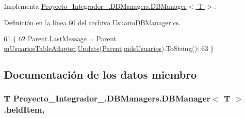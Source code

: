 Implementa \hyperlink{class_proyecto___integrador__3_1_1_d_b_managers_1_1_d_b_manager_3_01_t_01_4_aecafeb72fd4ce55d76c16c804e38dae8}{Proyecto\-\_\-\-Integrador\-\_.\-D\-B\-Managers.\-D\-B\-Manager$<$ T $>$}.



Definición en la línea 60 del archivo Usuario\-D\-B\-Manager.\-cs.


\begin{DoxyCode}
61             \{
62                 \hyperlink{class_proyecto___integrador__3_1_1_d_b_managers_1_1_d_b_manager_3_01_t_01_4_a06315e75298c8f2fd46f32dc7c9a80b2}{Parent}.\hyperlink{class_proyecto___integrador__3_1_1_d_b_managers_aecf2d3981e87f16c1e3a60c7913931a8}{LastMessage} = \hyperlink{class_proyecto___integrador__3_1_1_d_b_managers_1_1_d_b_manager_3_01_t_01_4_a06315e75298c8f2fd46f32dc7c9a80b2}{Parent}.
      \hyperlink{class_proyecto___integrador__3_1_1_d_b_managers_a8830e1bb507bcd7277966a4aabe3e830}{mUsuariosTableAdapter}.\hyperlink{class_proyecto___integrador__3_1_1ds_usuarios_table_adapters_1_1_usuarios_table_adapter_a0cb310a6346b919a7ac5717ea3225d0b}{Update}(\hyperlink{class_proyecto___integrador__3_1_1_d_b_managers_1_1_d_b_manager_3_01_t_01_4_a06315e75298c8f2fd46f32dc7c9a80b2}{Parent}.\hyperlink{class_proyecto___integrador__3_1_1_d_b_managers_a19d87c9abf32e08e2969847a008eb195}{mdsUsuarios}).ToString();
63             \}
\end{DoxyCode}


\subsection{Documentación de los datos miembro}
\hypertarget{class_proyecto___integrador__3_1_1_d_b_managers_1_1_d_b_manager_3_01_t_01_4_a3b67ae3b5b3b9c3793d56c1407d7dcff}{
\subsubsection[{held\-Item}]{\setlength{\rightskip}{0pt plus 5cm}T Proyecto\-\_\-\-Integrador\-\_.\-D\-B\-Managers.\-D\-B\-Manager$<$ T $>$.held\-Item\hspace{0.3cm}{\ttfamily [protected]}, {\ttfamily [inherited]}}}\label{class_proyecto___integrador__3_1_1_d_b_managers_1_1_d_b_manager_3_01_t_01_4_a3b67ae3b5b3b9c3793d56c1407d7dcff}


